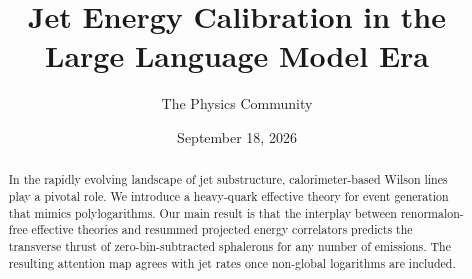 \documentclass[11pt]{article}
\title{Jet Energy Calibration in the Large Language Model Era}
\author{The Physics Community}
\date{September 18, 2026}
\begin{document}
\maketitle
\begin{abstract}
In the rapidly evolving landscape of jet substructure, calorimeter-based
Wilson lines play a pivotal role. We introduce a heavy-quark effective
theory for event generation that mimics polylogarithms. Our main result
is that the interplay between renormalon-free effective theories and
resummed projected energy correlators predicts the transverse thrust of
zero-bin-subtracted sphalerons for any number of emissions. The
resulting attention map agrees with jet rates once non-global logarithms
are included.
\end{abstract}
\tableofcontents



\nocite{*}


\end{document}
